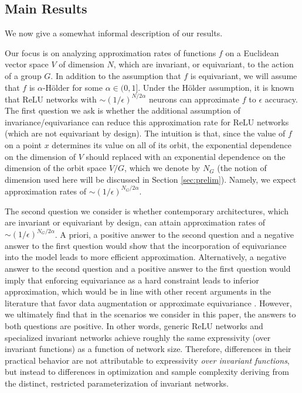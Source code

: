 \documentclass[twoside,11pt]{article}
\begin{document}
\subsection{Main  Results}

We now give a somewhat informal description of our results. 

Our focus is on analyzing approximation rates of functions $f$ on a Euclidean vector space $V$ of dimension $N$, which are invariant, or equivariant, to the action of a group $G$. In addition to the assumption that $f$ is equivariant, we will assume that $f$ is $\alpha$-H\"older for some $\alpha \in (0,1]$. Under the H\"older assumption, it is known that ReLU networks with $\sim (1/\epsilon)^{N/2\alpha} $ neurons can approximate $f$ to $\epsilon$ accuracy. The first question we ask is whether the additional assumption of invariance/equivariance can reduce this approximation rate for ReLU networks (which are not equivariant by design). The intuition is that, since the value of $f$ on a point $x$ determines its value on all of its orbit, the exponential dependence on the dimension of $V$ should replaced with an exponential dependence on the dimension of the orbit space  $V/G $, which we denote by $N_G$ (the notion of dimension used here will be discussed in Section \ref{sec:prelim}). Namely, we expect approximation rates of $\sim (1/\epsilon)^{N_G/2\alpha} $.

The second question we consider is whether contemporary architectures, which are invariant or equivariant by design, can attain approximation rates of $\sim (1/\epsilon)^{N_G/2\alpha} $. A priori, a positive answer to the second question and a negative answer to the first question would show that the incorporation of equivariance into the model leads to more efficient approximation. Alternatively, a negative answer to the second question and a positive answer to the first question would imply that enforcing equivariance as a hard constraint leads to inferior approximation, which would be in line with other recent arguments in the literature that favor data augmentation or approximate equivariance \citep{wang2022approximately,tahmasebiachieving}. However, we ultimately find that in the scenarios we consider in this paper, the answers to both questions are positive. In other words, generic ReLU networks and specialized invariant networks achieve roughly the same expressivity (over invariant functions) as a function of network size. Therefore, differences in their practical behavior are not attributable to expressivity \emph{over invariant functions}, but instead to differences in optimization and sample complexity deriving from the distinct, restricted parameterization of invariant networks.  %
\end{document}
